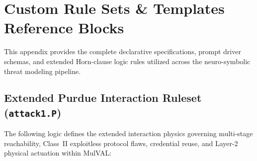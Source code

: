 \documentclass[target=mst,aauheader=aics,style=]{thud}
\begin{document}
\appendix

\chapter{Custom Rule Sets \& Templates Reference Blocks}
\label{chap:appendix_rules}
\label{app:attack_rules}

This appendix provides the complete declarative specifications, prompt driver schemas, and extended Horn-clause logic rules utilized across the neuro-symbolic threat modeling pipeline.

\section{Extended Purdue Interaction Ruleset (\texttt{attack1.P})}
The following logic defines the extended interaction physics governing multi-stage reachability, Class~II exploitless protocol flaws, credential reuse, and Layer-2 physical actuation within MulVAL:
\end{document}
